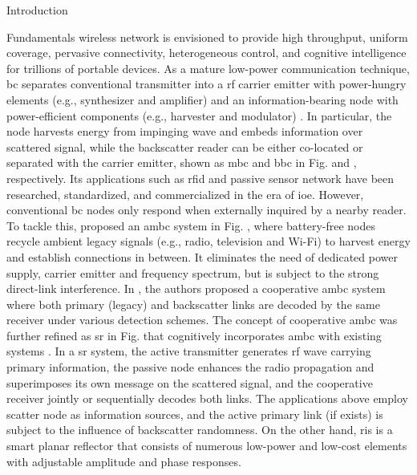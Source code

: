 \documentclass[journal]{IEEEtran}
\begin{document}
\glsresetall

\begin{section}{Introduction}
	\begin{subsection}{Fundamentals}
		 wireless network is envisioned to provide high throughput, uniform coverage, pervasive connectivity, heterogeneous control, and cognitive intelligence for trillions of portable devices.
		As a mature low-power communication technique, \gls{bc} separates conventional transmitter into a \gls{rf} carrier emitter with power-hungry elements (e.g., synthesizer and amplifier) and an information-bearing node with power-efficient components (e.g., harvester and modulator) \cite{Boyer2014}.
		In particular, the node harvests energy from impinging wave and embeds information over scattered signal, while the backscatter reader can be either co-located or separated with the carrier emitter, shown as \gls{mbc} and \gls{bbc} in Fig.  and , respectively.
		Its applications such as \gls{rfid} \cite{Dobkin2012,Landt2005} and passive sensor network \cite{Vannucci2008,Assimonis2016} have been researched, standardized, and commercialized in the era of \gls{ioe}.
		However, conventional \gls{bc} nodes only respond when externally inquired by a nearby reader.
		To tackle this, \cite{Liu2013b} proposed an \gls{ambc} system in Fig. , where battery-free nodes recycle ambient legacy signals (e.g., radio, television and Wi-Fi) to harvest energy and establish connections in between.
		It eliminates the need of dedicated power supply, carrier emitter and frequency spectrum, but is subject to the strong direct-link interference.
		In \cite{Yang2018}, the authors proposed a cooperative \gls{ambc} system where both primary (legacy) and backscatter links are decoded by the same receiver under various detection schemes.
		The concept of cooperative \gls{ambc} was further refined as \gls{sr} in Fig.  that cognitively incorporates \gls{ambc} with existing systems \cite{Liang2020}.
		In a \gls{sr} system, the active transmitter generates \gls{rf} wave carrying primary information, the passive node enhances the radio propagation and superimposes its own message on the scattered signal, and the cooperative receiver jointly or sequentially decodes both links.
		The applications above employ scatter node as information sources, and the active primary link (if exists) is subject to the influence of backscatter randomness.
		On the other hand, \gls{ris} is a smart planar reflector that consists of numerous low-power and low-cost elements with adjustable amplitude and phase responses.

\end{subsection}
\end{section}
\end{document}
